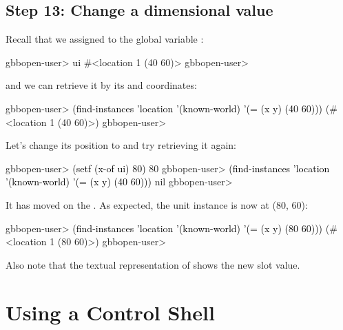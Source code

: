 \documentclass[10pt,twoside,english,pdftex]{article}
\begin{document}
\subsection*{Step 13: Change a dimensional value}

%
%
Recall that we assigned   to the global variable
:
%
\W\supp
\begin{example}
\textcolor{darkergray}{%
  gbbopen-user> \textcolor{black}{ui}
  #<location 1 (40 60)>
  gbbopen-user>}
\end{example}
%  
and we can retrieve it by its  and  coordinates:
%
\W\supp\notpretop
\begin{example}
\textcolor{darkergray}{%
  gbbopen-user> \textcolor{black}{(find-instances 'location '(known-world)
                  '(= (x y) (40 60)))}
  (#<location 1 (40 60)>)
  gbbopen-user>}
\end{example}

%
%
Let's change its  position to  and try retrieving it again:
%
\W\supp
\begin{example}
\textcolor{darkergray}{%
  gbbopen-user> \textcolor{black}{(setf (x-of ui) 80)}
  80
  gbbopen-user> \textcolor{black}{(find-instances 'location '(known-world)
                  '(= (x y) (40 60)))}
  nil
  gbbopen-user>}
\end{example}
%
It has moved on the .  As expected, the 
 unit instance is now at (80, 60):
%
\W\supp\notpretop
\begin{example}
\textcolor{darkergray}{%
  gbbopen-user> \textcolor{black}{(find-instances 'location '(known-world)
                  '(= (x y) (80 60)))}
  (#<location 1 (80 60)>)
  gbbopen-user>}
\end{example}
%
Also note that the textual representation of  
shows the new  slot value.


\T\markright{}%
\T\pagestyle{plain}
\T\cleardoublepage
\W{}
\T\pagestyle{fancy}
\T\thispagestyle{fancybottom}
\T\renewcommand{\headrulewidth}{0pt}
\section{Using a Control Shell}
\label{sec:control-shell}%
\end{document}
